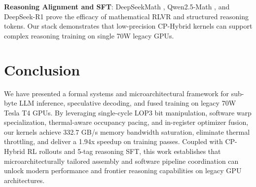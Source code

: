 \documentclass[10pt,twocolumn,letterpaper]{article}
\begin{document}
\textbf{Reasoning Alignment and SFT}: DeepSeekMath \cite{shao2024deepseekmath}, Qwen2.5-Math \cite{yang2024qwen25math}, and DeepSeek-R1 \cite{kumar2024grpo} prove the efficacy of mathematical RLVR and structured reasoning tokens. Our stack demonstrates that low-precision CP-Hybrid kernels can support complex reasoning training on single 70W legacy GPUs.

\section{Conclusion}
We have presented a formal systems and microarchitectural framework for sub-byte LLM inference, speculative decoding, and fused training on legacy 70W Tesla T4 GPUs. By leveraging single-cycle LOP3 bit manipulation, software warp specialization, thermal-aware occupancy pacing, and in-register optimizer fusion, our kernels achieve 332.7 GB/s memory bandwidth saturation, eliminate thermal throttling, and deliver a 1.94x speedup on training passes. Coupled with CP-Hybrid RL rollouts and 5-tag reasoning SFT, this work establishes that microarchitecturally tailored assembly and software pipeline coordination can unlock modern performance and frontier reasoning capabilities on legacy GPU architectures.



\end{document}
